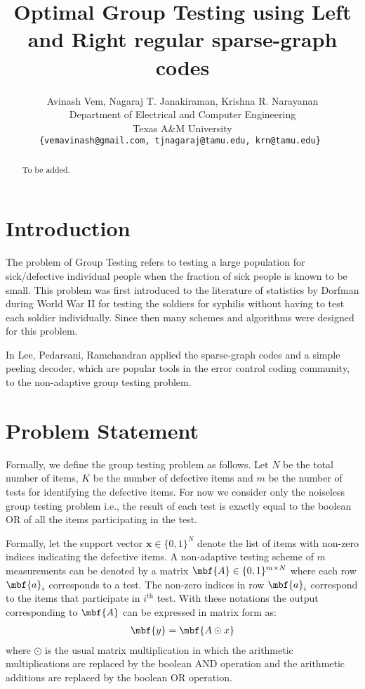 \documentclass[conference,twocolumn]{IEEEtran}
\begin{document}
\title{Optimal Group Testing using Left and Right regular sparse-graph codes}
\author{Avinash Vem, Nagaraj T. Janakiraman, Krishna R. Narayanan\\
Department of Electrical and Computer Engineering \\
Texas A\&M University\\
{\tt\small {\{vemavinash@gmail.com, tjnagaraj@tamu.edu, krn@tamu.edu\}} }}

\maketitle
\begin{abstract} 
To be added.
\end{abstract}

\section{Introduction}
The problem of Group Testing refers to testing a large population for sick/defective individual people when the fraction of sick people is known to be small. This problem was first introduced to the literature of statistics by Dorfman \cite{dorfman1943detection} during World War II for testing the soldiers for syphilis without having to test each soldier individually. Since then many schemes and algorithms were designed for this problem.

 In \cite{lee2015saffron} Lee, Pedarsani, Ramchandran applied the sparse-graph codes and a simple peeling decoder, which are popular tools in the error control coding community, to the non-adaptive group testing problem. \cite{atia2012boolean,mazumdar2015nonadaptive,lee2015saffron}

\section{Problem Statement}
Formally, we define the group testing problem as follows. Let $N$ be the total number of items, $K$ be the number of defective items and $m$ be the number of tests for identifying the defective items. For now we consider only the noiseless group testing problem i.e., the result of each test is exactly equal to the boolean OR of all the items participating in the test. 

Formally, let the support vector $\mathbf{x}\in\{0,1\}^{N}$ denote the list of items with non-zero indices indicating the defective items. A non-adaptive testing scheme of $m$ measurements can be denoted by a matrix $\mbf{A}\in\{0,1\}^{m\times N}$ where each row $\mbf{a}_{i}$ corresponds to a test. The non-zero indices in row $\mbf{a}_i$ correspond to the items that participate in $i^{\text{th}}$ test. With these notations the output corresponding to $\mbf{A}$ can be expressed in matrix form as:
\begin{align*}
\mbf{y}=\mbf{A\odot x}
\end{align*}
where $\odot$ is the usual matrix multiplication in which the arithmetic multiplications are replaced by the boolean AND operation and the arithmetic additions are replaced by the boolean OR operation.
\end{document}
